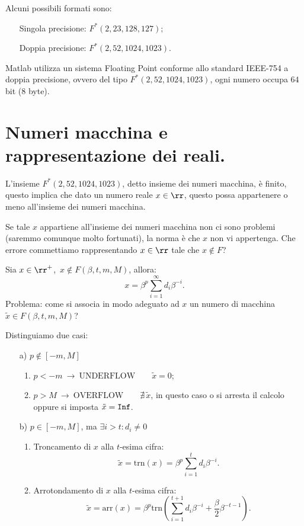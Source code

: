 Alcuni possibili formati sono:
\begin{itemize}
\item[] Singola precisione: $F^*(2,23,128,127);$
\item[] Doppia precisione: $F^*(2,52,1024,1023).$
\end{itemize}

Matlab utilizza un sistema Floating Point conforme allo standard IEEE-754
a doppia precisione, ovvero del tipo $F^*(2,52,1024,1023)$, ogni numero occupa
$64$ bit ($8$ byte).

\section{Numeri macchina e rappresentazione dei reali.}
L'insieme $F^*(2,52,1024,1023)$, detto insieme dei numeri macchina, è finito,
questo implica che dato un numero reale $x \in \rr$, questo possa appartenere
o meno all'insieme dei numeri macchina.

Se tale $x$ appartiene all'insieme dei numeri macchina non ci sono problemi
(saremmo comunque molto fortunati), la norma è che $x$ non vi appertenga.
Che errore commettiamo rappresentando $x \in \rr$ tale che $x \notin F$?
\begin{flushleft}
Sia $x \in \rr^+$, $\, x \notin F(\beta,t,m,M)$, allora:
\[x = \beta^p \sum_{i = 1}^{\infty}d_i \beta^{-i}.\]
Problema: come si associa in modo adeguato ad $x$ un numero di macchina
$\tilde{x} \in F(\beta,t,m,M)$?
\end{flushleft}
Distinguiamo due casi:
\begin{itemize}
\item[a)] $p \notin [-m,M]$
  \begin{enumerate}
  \item $p < -m \ \longrightarrow \ \textrm{UNDERFLOW}\qquad \tilde{x} = 0$;
  \item $p > M \ \longrightarrow \ \textrm{OVERFLOW} \qquad 
    \nexists\, \tilde{x}$, in questo caso o si arresta il calcolo oppure si
    imposta $\tilde{x} = \verb1Inf1$.
  \end{enumerate}
\item[b)]$p \in [-m,M]$, ma $\exists i > t \colon d_i \neq 0$
\begin{enumerate}
  \item Troncamento di $x$ alla $t$-esima cifra:
\[\tilde{x} = \textrm{trn}(x) = \beta^p \sum_{i=1}^td_i\beta^{-i}.\]
  \item Arrotondamento di $x$ alla $t$-esima cifra:
\[\tilde{x} = \textrm{arr}(x) = \beta^p \textrm{trn}\left(
\sum_{i=1}^{t+1}d_i\beta^{-i} + \frac{\beta}{2}\beta^{-t-1}\right).\]
  \end{enumerate}
\end{itemize}


